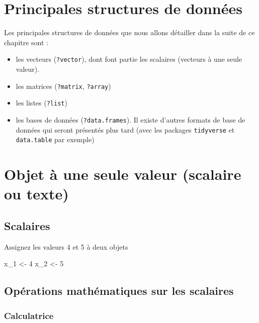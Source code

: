 \documentclass[
]{book}
\newenvironment{Shaded}{\begin{snugshade}}{\end{snugshade}}
\newcommand{\DecValTok}[1]{\textcolor[rgb]{0.00,0.00,0.81}{#1}}
\newcommand{\NormalTok}[1]{#1}
\newcommand{\OtherTok}[1]{\textcolor[rgb]{0.56,0.35,0.01}{#1}}
\providecommand{\tightlist}{%
  \setlength{\itemsep}{0pt}\setlength{\parskip}{0pt}}
\begin{document}
\section{Principales structures de données}\label{principales-structures-de-donnuxe9es}

Les principales structures de données que nous allons détailler dans la suite de ce chapitre sont :

\begin{itemize}
\tightlist
\item
  les vecteurs (\texttt{?vector}), dont font partie les scalaires (vecteurs à une seule valeur).
\item
  les matrices (\texttt{?matrix}, \texttt{?array})
\item
  les listes (\texttt{?list})
\item
  les bases de données (\texttt{?data.frames}). Il existe d'autres formats de base de données qui seront présentés plus tard (avec les packages \texttt{tidyverse} et \texttt{data.table} par exemple)
\end{itemize}

\section{Objet à une seule valeur (scalaire ou texte)}\label{objet-uxe0-une-seule-valeur-scalaire-ou-texte}

\subsection{Scalaires}\label{scalaires}

Assignez les valeurs 4 et 5 à deux objets

\begin{Shaded}
\begin{Highlighting}[]
\NormalTok{x\_1 }\OtherTok{\textless{}{-}} \DecValTok{4}
\NormalTok{x\_2 }\OtherTok{\textless{}{-}} \DecValTok{5}
\end{Highlighting}
\end{Shaded}

\subsection{Opérations mathématiques sur les scalaires}\label{opuxe9rations-mathuxe9matiques-sur-les-scalaires}

\subsubsection{Calculatrice}\label{calculatrice}
\end{document}

